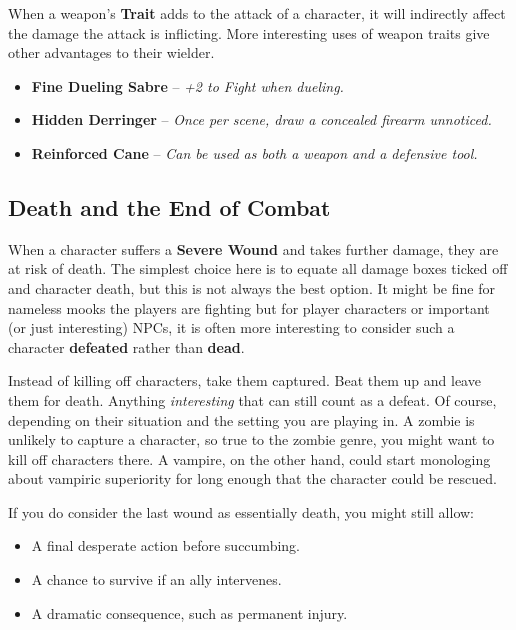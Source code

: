 When a weapon's \textbf{Trait} adds to the attack of a character, it will indirectly affect the damage the attack is inflicting. More interesting uses of weapon traits give other advantages to their wielder.

\begin{Example}
	\begin{itemize}
    	\item \textbf{Fine Dueling Sabre} – \textit{+2 to Fight when dueling.}
	    \item \textbf{Hidden Derringer} – \textit{Once per scene, draw a concealed firearm unnoticed.}
	    \item \textbf{Reinforced Cane} – \textit{Can be used as both a weapon and a defensive tool.}
	\end{itemize}
\end{Example}

\subsection{Death and the End of Combat}\label{core:death}
When a character suffers a \textbf{Severe Wound} and takes further damage, they are at risk of death. The simplest choice here is to equate all damage boxes ticked off and character death, but this is not always the best option. It might be fine for nameless mooks the players are fighting but for player characters or important (or just interesting) NPCs, it is often more interesting to consider such a character \textbf{defeated} rather than \textbf{dead}.

Instead of killing off characters, take them captured. Beat them up and leave them for death. Anything \emph{interesting} that can still count as a defeat. Of course, depending on their situation and the setting you are playing in. A zombie is unlikely to capture a character, so true to the zombie genre, you might want to kill off characters there. A vampire, on the other hand, could start monologing about vampiric superiority for long enough that the character could be rescued. 

If you do consider the last wound as essentially death, you might still allow:
\begin{itemize}
    \item A final desperate action before succumbing.
    \item A chance to survive if an ally intervenes.
    \item A dramatic consequence, such as permanent injury.
\end{itemize}

